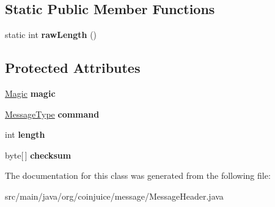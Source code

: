 \subsection*{Static Public Member Functions}
\begin{DoxyCompactItemize}
\item 
\hypertarget{classorg_1_1coinjuice_1_1message_1_1_message_header_a9e427a6b08dd3f3b1d905f9cfbd7670d}{static int {\bfseries raw\-Length} ()}\label{classorg_1_1coinjuice_1_1message_1_1_message_header_a9e427a6b08dd3f3b1d905f9cfbd7670d}

\end{DoxyCompactItemize}
\subsection*{Protected Attributes}
\begin{DoxyCompactItemize}
\item 
\hypertarget{classorg_1_1coinjuice_1_1message_1_1_message_header_ab68586d7252519a2ab5b66bd1274b01b}{\hyperlink{enumorg_1_1coinjuice_1_1message_1_1_message_header_1_1_magic}{Magic} {\bfseries magic}}\label{classorg_1_1coinjuice_1_1message_1_1_message_header_ab68586d7252519a2ab5b66bd1274b01b}

\item 
\hypertarget{classorg_1_1coinjuice_1_1message_1_1_message_header_a9293e161bd8407e5e3e96b506996958c}{\hyperlink{enumorg_1_1coinjuice_1_1message_1_1_message_type}{Message\-Type} {\bfseries command}}\label{classorg_1_1coinjuice_1_1message_1_1_message_header_a9293e161bd8407e5e3e96b506996958c}

\item 
\hypertarget{classorg_1_1coinjuice_1_1message_1_1_message_header_a653d89ccfecd213b4e7936ddda1b082c}{int {\bfseries length}}\label{classorg_1_1coinjuice_1_1message_1_1_message_header_a653d89ccfecd213b4e7936ddda1b082c}

\item 
\hypertarget{classorg_1_1coinjuice_1_1message_1_1_message_header_a53f7d7c14ab3e2579a1d270d675ab4cb}{byte\mbox{[}$\,$\mbox{]} {\bfseries checksum}}\label{classorg_1_1coinjuice_1_1message_1_1_message_header_a53f7d7c14ab3e2579a1d270d675ab4cb}

\end{DoxyCompactItemize}


The documentation for this class was generated from the following file\-:\begin{DoxyCompactItemize}
\item 
src/main/java/org/coinjuice/message/Message\-Header.\-java\end{DoxyCompactItemize}
